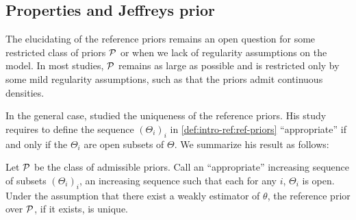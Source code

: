 \subsection{Properties and Jeffreys prior}\label{sec:intro-ref:properties}







The elucidating of the reference priors remains an open question for some restricted class of priors $\mathcal{P}$ or when we lack of regularity assumptions on the model.
In most studies, $\mathcal{P}$ remains as large as possible and is restricted only by some mild regularity assumptions, such as that the priors admit continuous densities.
    









In the general case, \citet{mure_objective_2018} studied the uniqueness of the reference priors. 
His study requires to define the sequence $(\Theta_i)_i$ in \cref{def:intro-ref:ref-priors} ``appropriate'' if and only if the $\Theta_i$ are open subsets of $\Theta$.
%
We summarize his result as follows:
\begin{thm}
    Let $\mathcal{P}$ be the class of admissible priors. 
    Call an ``appropriate'' increasing sequence of subsets $(\Theta_i)_i$, an increasing sequence such that each for any $i$, $\Theta_i$ is open.
    Under the assumption that there exist a weakly estimator of $\theta$, the reference prior over $\mathcal{P}$, if it exists, is unique.
\end{thm}

